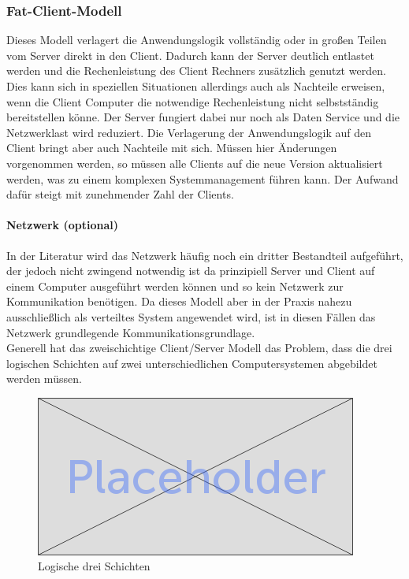 	\subsubsection{Fat-Client-Modell}
	Dieses Modell verlagert die Anwendungslogik vollständig oder in großen Teilen vom Server direkt in den Client. Dadurch kann der Server deutlich entlastet werden und die Rechenleistung des Client Rechners zusätzlich genutzt werden. Dies kann sich in speziellen Situationen allerdings auch als Nachteile erweisen, wenn die Client Computer die notwendige Rechenleistung nicht selbstständig bereitstellen könne. Der Server fungiert dabei nur noch als Daten Service und die Netzwerklast wird reduziert. Die Verlagerung der Anwendungslogik auf den Client bringt aber auch Nachteile mit sich. Müssen hier Änderungen vorgenommen werden, so müssen alle Clients auf die neue Version aktualisiert werden, was zu einem komplexen Systemmanagement führen kann. Der Aufwand dafür steigt mit zunehmender Zahl der Clients.
	
	\paragraph{Netzwerk (optional)}
	In der Literatur wird das Netzwerk häufig noch ein dritter Bestandteil aufgeführt, der jedoch nicht zwingend notwendig ist da prinzipiell Server und Client auf einem Computer ausgeführt werden können und so kein Netzwerk zur Kommunikation benötigen. Da dieses Modell aber in der Praxis nahezu ausschließlich als verteiltes System angewendet wird, ist in diesen Fällen das Netzwerk grundlegende Kommunikationsgrundlage.
	\\
	
	Generell hat das zweischichtige Client/Server Modell das Problem, dass die drei logischen Schichten auf zwei unterschiedlichen Computersystemen abgebildet werden müssen. \\
	
	\begin{figure}[h]
		\centering
		\includegraphics[width=0.7\linewidth]{images/placeholder}
		\caption{Logische drei Schichten}
		\label{fig:log3schichten}
	\end{figure}
	

